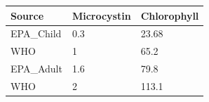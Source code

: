 \documentclass[11pt,]{article}
\begin{document}
\begin{longtable}[c]{@{}lll@{}}
\toprule
\begin{minipage}[b]{0.13\columnwidth}\raggedright\strut
Source
\strut\end{minipage} &
\begin{minipage}[b]{0.18\columnwidth}\raggedright\strut
Microcystin
\strut\end{minipage} &
\begin{minipage}[b]{0.18\columnwidth}\raggedright\strut
Chlorophyll
\strut\end{minipage}\tabularnewline
\midrule
\endhead
\begin{minipage}[t]{0.13\columnwidth}\raggedright\strut
EPA\_Child
\strut\end{minipage} &
\begin{minipage}[t]{0.18\columnwidth}\raggedright\strut
0.3
\strut\end{minipage} &
\begin{minipage}[t]{0.18\columnwidth}\raggedright\strut
23.68
\strut\end{minipage}\tabularnewline
\begin{minipage}[t]{0.13\columnwidth}\raggedright\strut
WHO
\strut\end{minipage} &
\begin{minipage}[t]{0.18\columnwidth}\raggedright\strut
1
\strut\end{minipage} &
\begin{minipage}[t]{0.18\columnwidth}\raggedright\strut
65.2
\strut\end{minipage}\tabularnewline
\begin{minipage}[t]{0.13\columnwidth}\raggedright\strut
EPA\_Adult
\strut\end{minipage} &
\begin{minipage}[t]{0.18\columnwidth}\raggedright\strut
1.6
\strut\end{minipage} &
\begin{minipage}[t]{0.18\columnwidth}\raggedright\strut
79.8
\strut\end{minipage}\tabularnewline
\begin{minipage}[t]{0.13\columnwidth}\raggedright\strut
WHO
\strut\end{minipage} &
\begin{minipage}[t]{0.18\columnwidth}\raggedright\strut
2
\strut\end{minipage} &
\begin{minipage}[t]{0.18\columnwidth}\raggedright\strut
113.1
\strut\end{minipage}\tabularnewline

\end{longtable}
\end{document}
